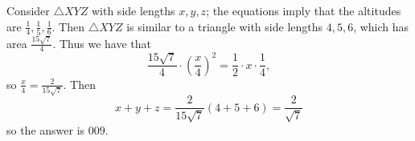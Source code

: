 Consider $\triangle{XYZ}$ with side lengths $x,y,z$; the equations imply that the altitudes are $\frac{1}{4},\frac{1}{5},\frac{1}{6}$. Then $\triangle{XYZ}$ is similar to a triangle with side lengths $4,5,6$, which has area $\frac{15\sqrt{7}}{4}$. Thus we have that
\[
	\frac{15\sqrt{7}}{4}\cdot\left(\frac{x}{4}\right)^2=\frac{1}{2}\cdot x\cdot\frac{1}{4},
\]
so $\frac{x}{4}=\frac{2}{15\sqrt{7}}$. Then
\[
	x+y+z=\frac{2}{15\sqrt{7}}(4+5+6)=\frac{2}{\sqrt{7}}
\]
so the answer is $009$.